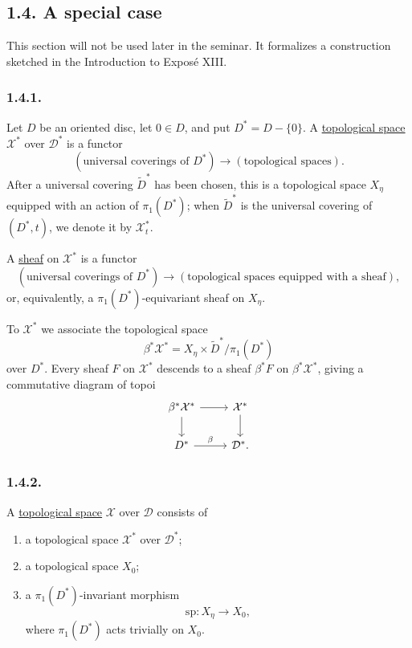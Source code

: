 \subsection*{1.4. A special case}

This section will not be used later in the seminar.  It formalizes a
construction sketched in the Introduction to Expos\'e XIII.

\subsubsection*{1.4.1.}
Let $D$ be an oriented disc, let $0\in D$, and put
$D^*=D-\{0\}$.  A \underline{topological space} $\mathcal X^*$ over
$\mathcal D^*$ is a functor
\[
(\text{universal coverings of }D^*)
\longrightarrow(\text{topological spaces}).
\]
After a universal covering $\widetilde D^*$ has been chosen, this is
a topological space $X_\eta$ equipped with an action of
$\pi_1(D^*)$; when $\widetilde D^*$ is the universal covering of
$(D^*,t)$, we denote it by $\mathcal X_t^*$.

A \underline{sheaf} on $\mathcal X^*$ is a functor
\[
(\text{universal coverings of }D^*)
\longrightarrow
(\text{topological spaces equipped with a sheaf}),
\]
or, equivalently, a $\pi_1(D^*)$-equivariant sheaf on $X_\eta$.

To $\mathcal X^*$ we associate the topological space
\[
\beta^*\mathcal X^*
=X_\eta\times\widetilde D^*/\pi_1(D^*)
\]
over $D^*$.  Every sheaf $F$ on $\mathcal X^*$ descends to a sheaf
$\beta^*F$ on $\beta^*\mathcal X^*$, giving a commutative diagram of
topoi
\[
\begin{tikzcd}
\beta^*\mathcal X^* \arrow[r] \arrow[d]
  & \mathcal X^* \arrow[d] \\
D^* \arrow[r, "\beta"]
  & \mathcal D^*.
\end{tikzcd}
\]

\subsubsection*{1.4.2.}
A \underline{topological space} $\mathcal X$ over $\mathcal D$
consists of
\begin{enumerate}[label=(\alph*),leftmargin=2.7em]
\item a topological space $\mathcal X^*$ over $\mathcal D^*$;
\item a topological space $X_0$;
\item a $\pi_1(D^*)$-invariant morphism
\[
\mathrm{sp}:X_\eta\longrightarrow X_0,
\]
where $\pi_1(D^*)$ acts trivially on $X_0$.
\end{enumerate}

